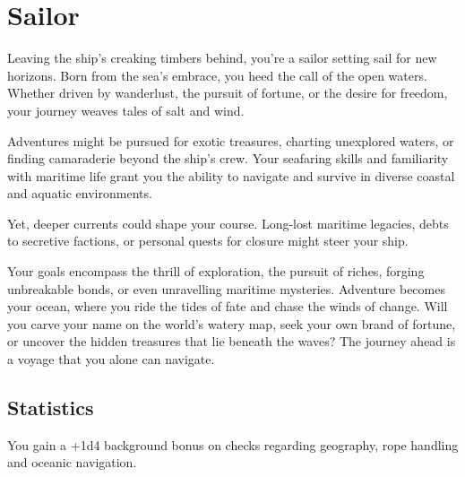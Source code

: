 \section{Sailor}\label{background:sailor}
Leaving the ship's creaking timbers behind, you're a sailor setting sail for new horizons.
Born from the sea's embrace, you heed the call of the open waters.
Whether driven by wanderlust, the pursuit of fortune, or the desire for freedom, your journey weaves tales of salt and wind.

Adventures might be pursued for exotic treasures, charting unexplored waters, or finding camaraderie beyond the ship's crew.
Your seafaring skills and familiarity with maritime life grant you the ability to navigate and survive in diverse coastal and aquatic environments.

Yet, deeper currents could shape your course.
Long-lost maritime legacies, debts to secretive factions, or personal quests for closure might steer your ship.

Your goals encompass the thrill of exploration, the pursuit of riches, forging unbreakable bonds, or even unravelling maritime mysteries.
Adventure becomes your ocean, where you ride the tides of fate and chase the winds of change.
Will you carve your name on the world's watery map, seek your own brand of fortune, or uncover the hidden treasures that lie beneath the waves?
The journey ahead is a voyage that you alone can navigate.

\subsection{Statistics}
You gain a +1d4 background bonus on checks regarding geography, rope handling and oceanic navigation.
